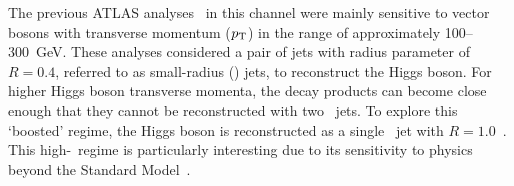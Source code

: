 

The previous ATLAS analyses~\cite{HIGG-2018-04,HIGG-2018-50} in this
channel were mainly sensitive to vector bosons with transverse
momentum ($p_{\text{T}}$) in the range of approximately 100--\SI{300}{\GeV}. These
analyses considered a pair of jets with radius parameter of $R= 0.4$,
referred to as small-radius (\smallR) jets, to reconstruct the Higgs
boson. For higher Higgs boson transverse momenta, the decay products
can become close enough that they cannot be reconstructed with
two \smallR\ jets.  To explore this `boosted' regime, the Higgs boson
is reconstructed as a single \largeR\ jet with
$R=1.0$~\cite{Butterworth:2008iy}.
This high-\pt\ regime is particularly interesting due to
its sensitivity to physics beyond the Standard
Model~\cite{Mimasu:2015nqa}.



